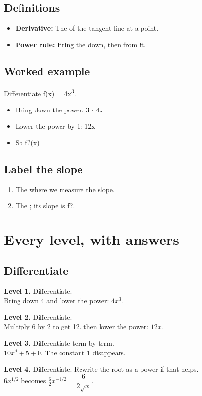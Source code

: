 \documentclass[11pt]{article}
\begin{document}
\subsection*{Definitions}\begin{itemize}
\item \textbf{Derivative:} The  of the tangent line at a point.
\item \textbf{Power rule:} Bring the  down, then  from it.
\end{itemize}
\subsection*{Worked example}
Differentiate f(x) = 4x\textsuperscript{3}.\\
\begin{itemize}
\item Bring down the power: 3 $\cdot$ 4x
\item Lower the power by 1: 12x
\item So f?(x) = 
\end{itemize}
\subsection*{Label the slope}
\begin{enumerate}
\item The  where we measure the slope.
\item The ; its slope is f?.
\end{enumerate}
\section*{Every level, with answers}
\subsection*{Differentiate}
\noindent\textbf{Level 1.} Differentiate.\\  \quad Bring down 4 and lower the power: $4x^{3}$.\par\medskip
\noindent\textbf{Level 2.} Differentiate.\\  \quad Multiply 6 by 2 to get 12, then lower the power: $12x$.\par\medskip
\noindent\textbf{Level 3.} Differentiate term by term.\\  \quad $10x^{4}+5+0$. The constant 1 disappears.\par\medskip
\noindent\textbf{Level 4.} Differentiate. Rewrite the root as a power if that helps.\\  \quad $6x^{1/2}$ becomes $\tfrac{6}{2}x^{-1/2}=\dfrac{6}{2\sqrt{x}}$.\par\medskip
\end{document}
